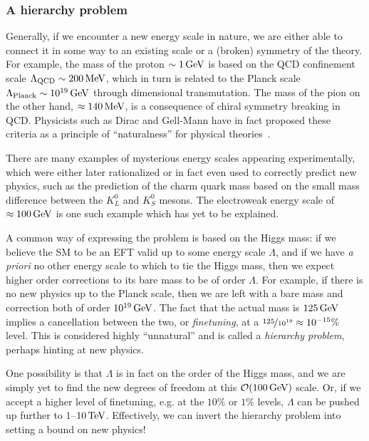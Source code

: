 \subsubsection{A hierarchy problem}

Generally, if we encounter a new energy scale in nature, we are either able to connect it in some way to an existing scale or a (broken) symmetry of the theory.
For example, the mass of the proton $\sim 1\,\text{Ge\hspace{-.08em}V}$ is based on the QCD confinement scale $\Lambda_{\text{QCD}} \sim 200\,\text{Me\hspace{-.08em}V}$, which in turn is related to the Planck scale $\Lambda_{\text{Planck}} \sim 10^{19}\,\text{Ge\hspace{-.08em}V}$ through dimensional transmutation.
The mass of the pion on the other hand, $\approx 140\,\text{Me\hspace{-.08em}V}$, is a consequence of chiral symmetry breaking in QCD.
Physicists such as Dirac and Gell-Mann have in fact proposed these criteria as a principle of ``naturalness'' for physical theories~\cite{Dirac:1938mt, Gell-Mann:1956iqa}.

There are many examples of mysterious energy scales appearing experimentally, which were either later rationalized or in fact even used to correctly predict new physics, such as the prediction of the charm quark mass based on the small mass difference between the $K_L^0$ and $K_S^0$ mesons.
The electroweak energy scale of $\approx 100\,\text{Ge\hspace{-.08em}V}$ is one such example which has yet to be explained.

A common way of expressing the problem is based on the Higgs mass: if we believe the SM to be an EFT valid up to some energy scale $\Lambda$, and if we have \textit{a priori} no other energy scale to which to tie the Higgs mass, then we expect higher order corrections to its bare mass to be of order $\Lambda$.
For example, if there is no new physics up to the Planck scale, then we are left with a bare mass and correction both of order $10^{19} \,\text{Ge\hspace{-.08em}V}$.
The fact that the actual mass is $125 \,\text{Ge\hspace{-.08em}V}$ implies a cancellation between the two, or \textit{finetuning}, at a $\nicefrac{125}{10^{19}} \approx 10^{-15}\%$ level.
This is considered highly ``unnatural'' and is called a \textit{hierarchy problem}, perhaps hinting at new physics.

One possibility is that $\Lambda$ is in fact on the order of the Higgs mass, and we are simply yet to find the new degrees of freedom at this $\mathcal O(100\,\text{Ge\hspace{-.08em}V})$ scale.
Or, if we accept a higher level of finetuning, e.g. at the $10\%$ or $1\%$ levels, $\Lambda$ can be pushed up further to $1$--$10\,\text{Te\hspace{-.08em}V}$.
Effectively, we can invert the hierarchy problem into setting a bound on new physics!

